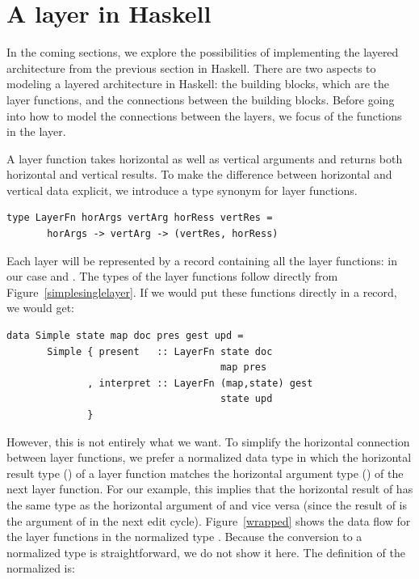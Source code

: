 \documentclass[preprint,natbib]{sigplanconf}
\begin{document}
%																
%																
%																
\section{A layer in Haskell} \label{sect:layerInHaskell}

In the coming sections, we explore the possibilities of implementing the layered architecture from the previous section in Haskell. There are two aspects to modeling a layered architecture in Haskell: the building blocks, which are the layer functions, and the connections between the building blocks. Before going into how to model the connections between the layers, we focus of the functions in the layer.

A layer function takes  horizontal as well as vertical arguments and returns both  horizontal and vertical results. To make the difference between horizontal and vertical data explicit, we introduce a type synonym for layer functions.



\begin{small}
\begin{verbatim}
type LayerFn horArgs vertArg horRess vertRes =
       horArgs -> vertArg -> (vertRes, horRess)
\end{verbatim}
\end{small}



Each layer will be represented by a record containing all the layer functions: in our case  and . The types of the layer functions follow directly from Figure~\ref{simplesinglelayer}.  If we would put these functions directly in a record, we would get:

\begin{small}
\begin{verbatim}
data Simple state map doc pres gest upd =
       Simple { present   :: LayerFn state doc 
                                     map pres
              , interpret :: LayerFn (map,state) gest
                                     state upd
              }
\end{verbatim}
\end{small}


However, this is not entirely what we want. To simplify the horizontal connection between layer functions, we prefer a normalized data type in which the horizontal result type () of a layer function matches the horizontal argument type () of the next layer function. For our example, this implies that the horizontal result of  has the same type as the horizontal argument of  and vice versa (since the result of  is the argument of  in the next edit cycle). Figure~\ref{wrapped} shows the data flow for the layer functions in the normalized type . Because the conversion to a normalized type is straightforward, we do not show it here. The definition of the normalized  is:
\end{document}

